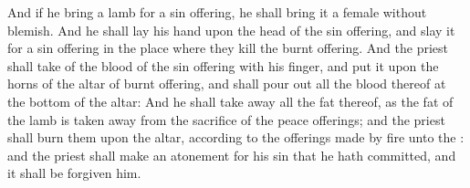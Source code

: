 \begin{biblechapter}
\verse And if he bring a lamb for a sin offering, he shall bring it a female without blemish.
\verse And he shall lay his hand upon the head of the sin offering, and slay it for a sin offering in the place where they kill the burnt offering.
\verse And the priest shall take of the blood of the sin offering with his finger, and put it upon the horns of the altar of burnt offering, and shall pour out all the blood thereof at the bottom of the altar:
\verse And he shall take away all the fat thereof, as the fat of the lamb is taken away from the sacrifice of the peace offerings; and the priest shall burn them upon the altar, according to the offerings made by fire unto the \LORD: and the priest shall make an atonement for his sin that he hath committed, and it shall be forgiven him.
\end{biblechapter}

\flushcolsend\columnbreak %


